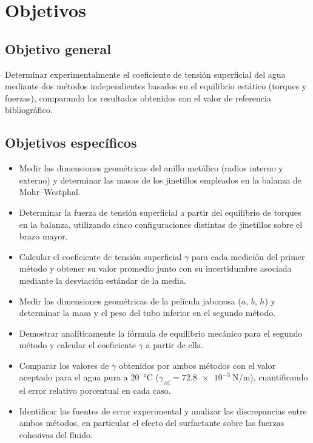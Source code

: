 
\section{Objetivos}

\subsection{Objetivo general}

Determinar experimentalmente el coeficiente de tensión superficial del agua
mediante dos métodos independientes basados en el equilibrio estático (torques
y fuerzas), comparando los resultados obtenidos con el valor de referencia
bibliográfico.

\subsection{Objetivos específicos}

\begin{itemize}
    \item Medir las dimensiones geométricas del anillo metálico (radios interno
    y externo) y determinar las masas de los jinetillos empleados en la balanza de
    Mohr--Westphal.

    \item Determinar la fuerza de tensión superficial a partir del equilibrio
    de torques en la balanza, utilizando cinco configuraciones distintas de
    jinetillos sobre el brazo mayor.

    \item Calcular el coeficiente de tensión superficial $\gamma$ para cada
    medición del primer método y obtener su valor promedio junto con su
    incertidumbre asociada mediante la desviación estándar de la media.

    \item Medir las dimensiones geométricas de la película jabonosa ($a$, $b$,
    $h$) y determinar la masa y el peso del tubo inferior en el segundo método.

    \item Demostrar analíticamente la fórmula de equilibrio mecánico para el
    segundo método y calcular el coeficiente $\gamma$ a partir de ella.

    \item Comparar los valores de $\gamma$ obtenidos por ambos métodos con el
    valor aceptado para el agua pura a \SI{20}{\celsius}
    ($\gamma_{\text{ref}} = \SI{72.8e-3}{\newton\per\meter}$), cuantificando
    el error relativo porcentual en cada caso.

    \item Identificar las fuentes de error experimental y analizar las discrepancias
    entre ambos métodos, en particular el efecto del surfactante sobre las fuerzas
    cohesivas del fluido.
\end{itemize}